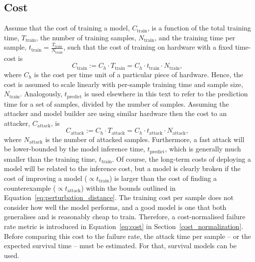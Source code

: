 \subsection{Cost}
\label{cost}

Assume that the cost of training a model, $C_{\mathrm{train}}$, is a function of the total training time, $T_{\mathrm{train}}$, the number of training samples, $N_{\mathrm{train}}$, and the training time per sample, $t_{\mathrm{train}} = \frac{T_{\mathrm{train}}}{N_{\mathrm{train}}}$, such that the cost of training on hardware with a fixed time-cost is
\begin{equation}
    C_{\mathrm{train}} := C_{h} \cdot T_{\mathrm{train}} = C_h \cdot t_{\mathrm{train}} \cdot N_{\mathrm{train}},
    \label{eq:naive_cost}
\end{equation}
where $C_h$ is the cost per time unit of a particular piece of hardware. Hence, the cost is assumed to scale linearly with per-sample training time and sample size, $N_{\mathrm{train}}$.
Analogously, $t_{\mathrm{predict}}$ is used elsewhere in this text to refer to the prediction time for a set of samples, divided by the number of samples. Assuming the attacker and model builder are using similar hardware then the cost to an attacker, $C_{\mathrm{attack}}$, is
\[
    C_{\mathrm{attack}} := C_{h} \cdot T_{\mathrm{attack}} = C_h \cdot t_{\mathrm{attack}} \cdot N_{\mathrm{attack}},
\]
where $ N_{\mathrm{attack}} $ is the number of attacked samples. Furthermore, a fast attack will be lower-bounded by the model inference time, $ t_{\mathrm{predict}} $, which is generally much smaller than the training time, $ t_{\mathrm{train}} $. Of course, the long-term costs of deploying a model will be related to the inference cost, but a model is clearly broken if the cost of improving a model ($\propto t_{\mathrm{train}}$) is larger than the cost of finding a counterexample ($\propto t_{\mathrm{attack}}$) within the bounds outlined in Equation~\ref{eq:perturbation_distance}. The training cost per sample does not consider how well the model performs, and a good model is one that both generalises and is reasonably cheap to train.
Therefore, a cost-normalised failure rate metric is introduced in Equation~\ref{eq:cost} in Section~\ref{cost_normalization}. Before comparing this cost to the failure rate, the attack time per sample -- or the expected survival time --  must be estimated. For that, survival models can be used.
